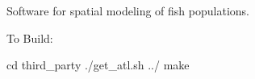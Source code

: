 Software for spatial modeling of fish populations.

To Build\+:

cd third\+\_\+party ./get\+\_\+atl.sh ../ make 